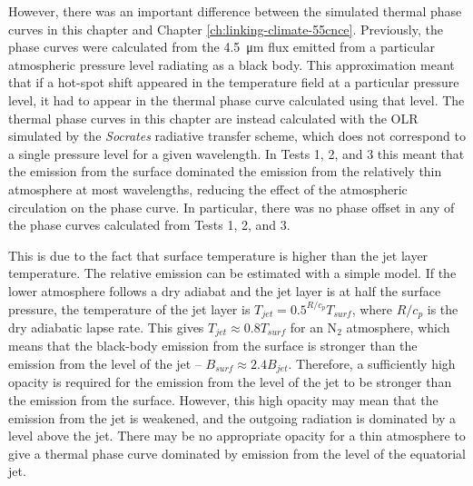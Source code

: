 However, there was an important difference between the simulated thermal phase curves in this chapter and Chapter \ref{ch:linking-climate-55cnce}. Previously, the phase curves were calculated from the \SI{4.5}{\micro\metre} flux emitted from a particular atmospheric pressure level radiating as a black body. This approximation meant that if a hot-spot shift appeared in the temperature field at a particular pressure level, it had to appear in the thermal phase curve calculated using that level. The thermal phase curves in this chapter are instead calculated with the OLR simulated by the \textit{Socrates} radiative transfer scheme, which does not correspond to a single pressure level for a given wavelength. In Tests 1, 2, and 3 this meant that the emission from the surface dominated the emission from the relatively thin atmosphere at most wavelengths, reducing the effect of the atmospheric circulation on the phase curve. In particular, there was no phase offset in any of the phase curves calculated from Tests 1, 2, and 3.

This is due to the fact that surface temperature is higher than the jet layer temperature. The relative emission can be estimated with a simple model. If the lower atmosphere follows a dry adiabat and the jet layer is at half the surface pressure, the temperature of the jet layer is $T_{jet} = 0.5^{R/c_{p}}T_{surf}$, where $R/c_{p}$ is the dry adiabatic lapse rate. This gives $T_{jet} \approx 0.8 T_{surf}$ for an N$_{2}$ atmosphere, which means that the black-body emission from the surface is stronger than the emission from the level of the jet -- $B_{surf} \approx 2.4 B_{jet}$. Therefore, a sufficiently high opacity is required for the emission from the level of the jet to be stronger than the emission from the surface. However, this high opacity may mean that the emission from the jet is weakened, and the outgoing radiation is dominated by a level above the jet. There may be no appropriate opacity for a thin atmosphere to give a thermal phase curve dominated by emission from the level of the equatorial jet.







